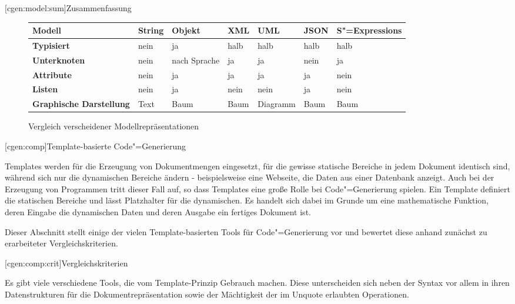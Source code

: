 \documentclass[a4paper, bibgerm]{book}
\newcommand\lsection{}
\newcommand\lsubsection{}
\newcommand{\sexps}{S"=Expressions}
\newcommand{\cgen}{Code"=Generierung}
\begin{document}
\lsubsection[cgen:model:sum]{Zusammenfassung}

\begin{figure}[htp]
  \centering
\begin{tabular}{|l|l|l|l|l|l|l|}\hline
\bf Modell                 & \bf String & \bf Objekt   & \bf XML & \bf UML & \bf JSON & \bf \sexps{} \\\hline\hline
\bf Typisiert              & nein       & ja           & halb    & halb    & halb     & halb         \\\hline
\bf Unterknoten            & nein       & nach Sprache & ja      & ja      & nein     & ja           \\\hline
\bf Attribute              & nein       & ja           & ja      & ja      & ja       & nein         \\\hline
\bf Listen                 & nein       & ja           & nein    & nein    & ja       & nein         \\\hline
\bf Graphische Darstellung & Text       & Baum         & Baum    & Diagramm& Baum     & Baum         \\\hline
\end{tabular}  
  \caption{Vergleich verscheidener Modellrepräsentationen}
\end{figure}

\lsection[cgen:comp]{Template-basierte \cgen{}}

Templates werden für die Erzeugung von Dokumentmengen eingesetzt, für
die gewisse statische Bereiche in jedem Dokument identisch sind, während
sich nur die dynamischen Bereiche ändern - beispielsweise eine Webseite,
die Daten aus einer Datenbank anzeigt. Auch bei der Erzeugung von
Programmen tritt dieser Fall auf, so dass Templates eine große Rolle bei
\cgen{} spielen. Ein Template definiert die
statischen Bereiche und lässt Platzhalter für die dynamischen. Es
handelt sich dabei im Grunde um eine mathematische Funktion, deren
Eingabe die dynamischen Daten und deren Ausgabe ein fertiges Dokument
ist.

Dieser Abschnitt stellt einige der vielen Template-basierten Tools für
\cgen{} vor und bewertet diese anhand zunächst zu erarbeiteter
Vergleichskriterien.

\lsubsection[cgen:comp:crit]{Vergleichskriterien}

Es gibt viele verschiedene Tools, die vom Template-Prinzip Gebrauch
machen. Diese unterscheiden sich neben der Syntax vor allem in ihren
Datenstrukturen für die Dokumentrepräsentation sowie der Mächtigkeit der
im Unquote erlaubten Operationen. 
\end{document}
